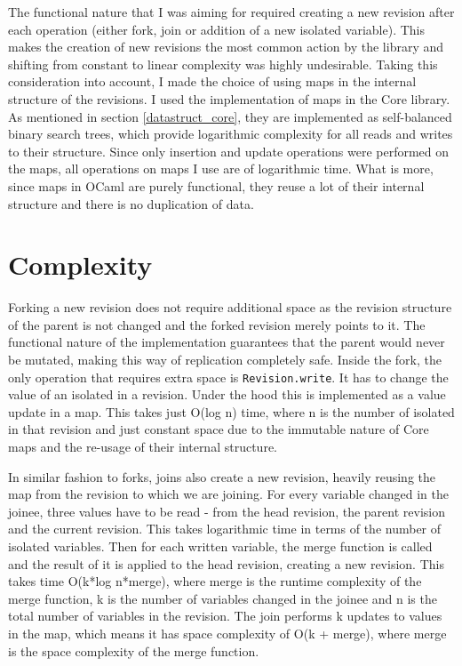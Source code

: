 \documentclass[12pt,twoside,notitlepage]{report}
\begin{document}
{The functional nature that I was aiming for required creating a new revision after each operation (either fork, join or addition of a new isolated variable). This makes the creation of new revisions the most common action by the library and shifting from constant to linear complexity was highly undesirable. Taking this consideration into account, I made the choice of using maps in the internal structure of the revisions. I used the implementation of maps in the Core library. As mentioned in section \ref{datastruct_core}, they are implemented as self-balanced binary search trees, which provide logarithmic complexity for all reads and writes to their structure. Since only insertion and update operations were performed on the maps, all operations on maps I use are of logarithmic time. What is more, since maps in OCaml are purely functional, they reuse a lot of their internal structure and there is no duplication of data. 

\section{Complexity}
\label{complexity}
Forking a new revision does not require additional space as the revision structure of the parent is not changed and the forked revision merely points to it. The functional nature of the implementation guarantees that the parent would never be mutated, making this way of replication completely safe. Inside the fork, the only operation that requires extra space is {\tt Revision.write}. It has to change the value of an isolated in a revision. Under the hood this is implemented as a value update in a map. This takes just O(log n) time, where n is the number of isolated in that revision and just constant space due to the immutable nature of Core maps and the re-usage of their internal structure. 

In similar fashion to forks, joins also create a new revision, heavily reusing the map from the revision to which we are joining. For every variable changed in the joinee, three values have to be read - from the head revision, the parent revision and the current revision. This takes logarithmic time in terms of the number of isolated variables. Then for each written variable, the merge function is called and the result of it is applied to the head revision, creating a new revision. This takes time O(k*log n*merge), where merge is the runtime complexity of the merge function, k is the number of variables changed in the joinee and n is the total number of variables in the revision. The join performs k updates to values in the map, which means it has space complexity of O(k + merge), where merge is the space complexity of the merge function. 

}
\end{document}
